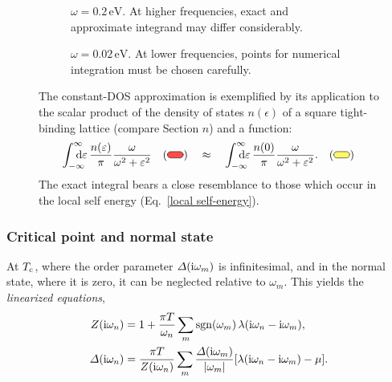 \begin{figure}[b]
    \small
    \begin{subfigure}{6.75cm}
        
        \caption{$\omega = 0.2\,\mathrm{eV}$. At higher frequencies, exact and
                 approximate integrand may differ considerably.}
    \end{subfigure}%
    \hfill%
    \begin{subfigure}{6.75cm}
        
        \caption{$\omega = 0.02\,\mathrm{eV}$. At lower frequencies, points for
                 numerical integration must be chosen carefully.}
    \end{subfigure}
    \captionsetup{singlelinecheck=off}
    \caption[Constant-DOS approximation]{ %
        The constant-DOS approximation is exemplified by its application to the
        scalar product of the density of states $n(\epsilon)$ of a square
        tight-binding lattice (compare Section $n$) and a 
        function:
        \begin{align*}
            \int \from{-\infty} \till \infty
            \D \epsilon \, \frac {n(\epsilon)} \pi
            \frac \omega {\omega^2 + \epsilon^2}
            \quad
            (\tikz \draw [fill=red!70!white, rounded corners=3pt]
                (0, 0) rectangle (0.5, 0.2);)
            \quad \approx \quad
            \int \from{-\infty} \till \infty
            \D \epsilon \, \frac {n(0)} \pi
            \frac \omega {\omega^2 + \epsilon^2}.
            \quad
            (\tikz \draw [fill=yellow!60!white, rounded corners=3pt]
                (0, 0) rectangle (0.5, 0.2);)
        \end{align*}
        The exact integral bears a close resemblance to those which occur in the
        local self energy (Eq.~\ref{local self-energy}).
        }
    \label{constant-DOS approximation}
\end{figure}

\subsubsection{Critical point and normal state}

At $T \sb{\text{c}}$, where the order parameter $\varDelta(\mathrm i \omega_m)$ is infinitesimal,
and in the normal state, where it is zero, it can be neglected relative to
$\omega_m$. This yields the \emph{linearized  equations},
%
\begin{subequations} \label{linearized Eliashberg equations}
    \begin{align}
        Z(\mathrm i \omega_n) &= 1 + \frac{\pi T}{\omega_n} \sum_m
        \operatorname{sgn}(\omega_m) \, \lambda(\mathrm i \omega_n - \mathrm i \omega_m),
        \\
        \varDelta(\mathrm i \omega_n) &= \frac{\pi T}{Z(\mathrm i \omega_n)} \sum_m
        \frac{\varDelta(\mathrm i \omega_m)}{|\omega_m|}
        [\lambda(\mathrm i \omega_n - \mathrm i \omega_m) - \mu].
    \end{align}
\end{subequations}

